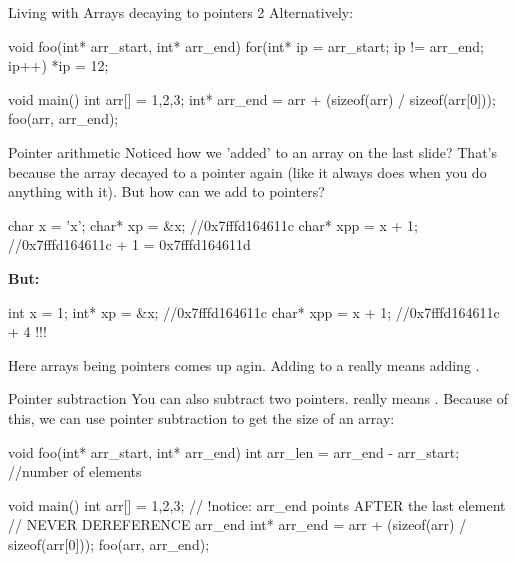\documentclass[10pt,graphics,aspectratio=169,table]{beamer}
\begin{document}
\begin{frame}[fragile]{Living with Arrays decaying to pointers 2}
    Alternatively:
    \begin{codeblock} 
void foo(int* arr_start, int* arr_end){ 
    for(int* ip = arr_start; ip != arr_end; ip++){
        *ip = 12;
    }
}

void main(){
    int arr[] = {1,2,3};
    int* arr_end = arr + (sizeof(arr) / sizeof(arr[0]));
    foo(arr, arr_end);
}
    \end{codeblock} 

\end{frame}

\begin{frame}[fragile]{Pointer arithmetic}
    Noticed how we 'added' to an array on the last slide?
    That's because the array decayed to a pointer again 
    (like it always does when you do anything with it).
    But how can we add to pointers?
    \begin{codeblock} 
char x = 'x';
char* xp = &x; //0x7fffd164611c
char* xpp = x + 1;  //0x7fffd164611c + 1 = 0x7fffd164611d
    \end{codeblock} 

    \textbf{But:} 
    \begin{codeblock} 
int x = 1;
int* xp = &x; //0x7fffd164611c
char* xpp = x + 1;  //0x7fffd164611c + 4  !!!
    \end{codeblock}

    Here arrays being pointers comes up agin. 
    Adding  to a  really means adding .
\end{frame}

\begin{frame}[fragile]{Pointer subtraction}
    You can also subtract two pointers. 
     really means .
    Because of this, we can use pointer subtraction to get the size of an array:
    \begin{codeblock} 
void foo(int* arr_start, int* arr_end){ 
   int arr_len = arr_end  - arr_start; //number of elements
}
        
void main(){
    int arr[] = {1,2,3};
    // !notice: arr_end points AFTER the last element
    // NEVER DEREFERENCE arr_end
    int* arr_end = arr + (sizeof(arr) / sizeof(arr[0]));
    foo(arr, arr_end);
}
    \end{codeblock} 
        
\end{frame}
\end{document}
